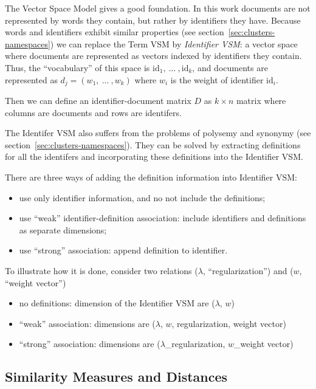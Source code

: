 The Vector Space Model gives a good foundation. In this work documents
are not represented by words they contain, but rather by identifiers they
have. Because  words and identifiers exhibit similar properties
(see section~\ref{sec:clusters-namespaces}) we can replace the
Term VSM by \emph{Identifier VSM}: a vector space where documents are represented as
vectors indexed by identifiers they contain.
Thus, the ``vocabulary'' of this space is $\text{id}_1, \ ... \ , \text{id}_k$, and
documents are represented as $d_j = (w_1, \ ... \ , w_k)$ where
$w_i$ is the weight of identifier $\text{id}_i$.

Then we can define an identifier-document matrix $D$ as $k \times n$
matrix where columns are documents and rows are identifers.

The Identifer VSM also suffers from the problems of polysemy
and synonymy (see section~\ref{sec:clusters-namespaces}). They
can be solved by extracting definitions for all the identifers
and incorporating these definitions into the Identifier VSM.

There are three ways of adding the definition information into
Identifier VSM:


\begin{itemize}
\itemsep1pt\parskip0pt
  \item use only identifier information, and no not include the definitions;
  \item use ``weak'' identifier-definition association: include identifiers and
        definitions as separate dimensions;
  \item use ``strong'' association: append definition to identifier.
\end{itemize}

To illustrate how it is done, consider two relations ($\lambda$, ``regularization'')
and ($w$, ``weight vector'')


\begin{itemize}\itemsep1pt\parskip0pt
  \item no definitions: dimension of the Identifier VSM are ($\lambda$, $w$)
  \item ``weak'' association:  dimensions are ($\lambda$, $w$, regularization, weight vector)
  \item ``strong'' association:  dimensions are ($\lambda$\_regularization, $w$\_weight vector)
\end{itemize}



\subsection{Similarity Measures and Distances} \label{sec:similarity-distance}

